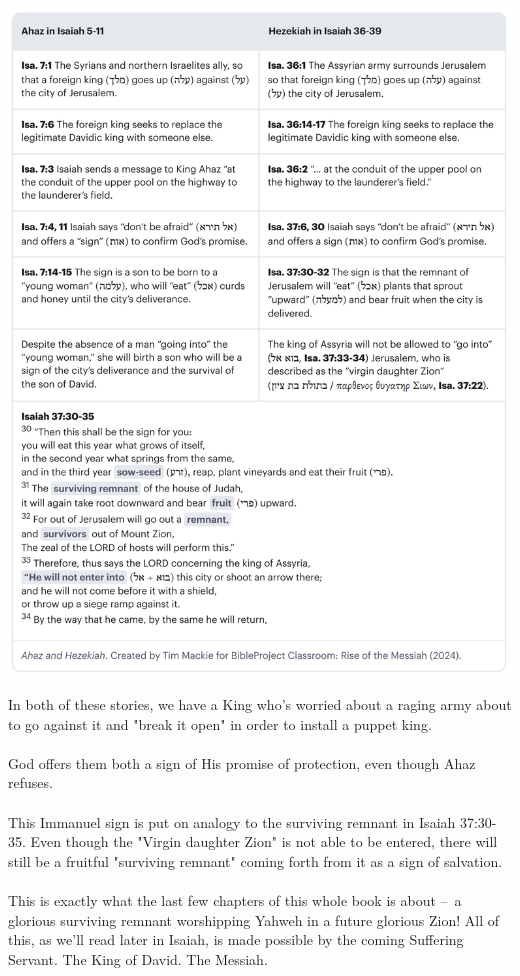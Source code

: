 \documentclass[11pt]{article}
\begin{document}
\begin{center}
\includegraphics[width=1\textwidth]{ahaz-hezekiah-comparison.png}
\end{center}
{\vspace{1em}}
In both of these stories, we have a King who's worried about a raging army about to go against it and "break it open" in order to install a puppet king.
\\\\
God offers them both a sign of His promise of protection, even though Ahaz refuses.
\\\\
This Immanuel sign is put on analogy to the surviving remnant in Isaiah 37:30-35. Even though the "Virgin daughter Zion" is not able to be entered, there will still be a fruitful "surviving remnant" coming forth from it as a sign of salvation.
\\\\
This is exactly what the last few chapters of this whole book is about – a glorious surviving remnant worshipping Yahweh in a future glorious Zion! All of this, as we'll read later in Isaiah, is made possible by the coming Suffering Servant. The King of David. The Messiah.
\end{document}
